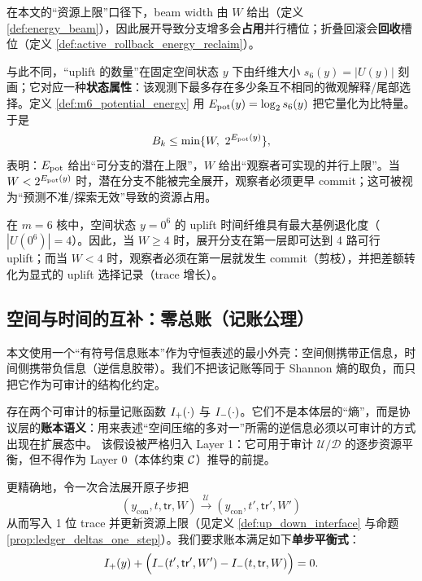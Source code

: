 \begin{remark}\label{rem:uplift_more_energy_clarification}
在本文的“资源上限”口径下，beam width 由 \(W\) 给出（定义 \ref{def:energy_beam}），因此展开导致分支增多会\textbf{占用}并行槽位；折叠回滚会\textbf{回收}槽位（定义 \ref{def:active_rollback_energy_reclaim}）。

与此不同，“uplift 的数量”在固定空间状态 \(y\) 下由纤维大小 \(s_6(y)=|U(y)|\) 刻画；它对应一种\textbf{状态属性}：该观测下最多存在多少条互不相同的微观解释/尾部选择。定义 \ref{def:m6_potential_energy} 用 \(E_{\mathrm{pot}}(y)=\log_2 s_6(y)\) 把它量化为比特量。于是
$$
B_k\le \min\{W,\ 2^{\Energy_{\mathrm{pot}}(y)}\},
$$
表明：\(E_{\mathrm{pot}}\) 给出“可分支的潜在上限”，\(W\) 给出“观察者可实现的并行上限”。当 \(W<2^{E_{\mathrm{pot}}(y)}\) 时，潜在分支不能被完全展开，观察者必须更早 commit；这可被视为“预测不准/探索无效”导致的资源占用。
\end{remark}

\begin{corollary}[最大分支压力发生在 \texorpdfstring{$y=0^6$}{y=0^6}]\label{cor:max_branch_pressure_y0}
在 \(m=6\) 核中，空间状态 \(y=0^6\) 的 uplift 时间纤维具有最大基例退化度（\(|U(0^6)|=4\)）。因此，当 \(W\ge 4\) 时，展开分支在第一层即可达到 4 路可行 uplift；而当 \(W<4\) 时，观察者必须在第一层就发生 commit（剪枝），并把差额转化为显式的 uplift 选择记录（trace 增长）。
\end{corollary}

\subsection{空间与时间的互补：零总账（记账公理）}
本文使用一个“有符号信息账本”作为守恒表述的最小外壳：空间侧携带正信息，时间侧携带负信息（逆信息胶带）。我们不把该记账等同于 Shannon 熵的取负，而只把它作为可审计的结构化约定。

\begin{assumption}\label{ass:zero_ledger}
存在两个可审计的标量记账函数 \(I_{+}(\cdot)\) 与 \(I_{-}(\cdot)\)。它们不是本体层的“熵”，而是协议层的\textbf{账本语义}：用来表述“空间压缩的多对一”所需的逆信息必须以可审计的方式出现在扩展态中。
该假设被严格归入 Layer 1：它可用于审计 \(\mathcal U/\mathcal D\) 的逐步资源平衡，但不得作为 Layer 0（本体约束 \(\mathcal{C}\)）推导的前提。

更精确地，令一次合法展开原子步把
$$
(y_{\mathrm{con}},t,\mathsf{tr},W)\xrightarrow{\ \mathcal U\ }(y_{\mathrm{con}},t',\mathsf{tr}',W')
$$
从而写入 1 位 trace 并更新资源上限（见定义 \ref{def:up_down_interface} 与命题 \ref{prop:ledger_deltas_one_step}）。我们要求账本满足如下\textbf{单步平衡式}：
$$
I_{+}(y)+\Bigl(I_{-}(t',\mathsf{tr}',W')-I_{-}(t,\mathsf{tr},W)\Bigr)=0.
$$
\end{assumption}

